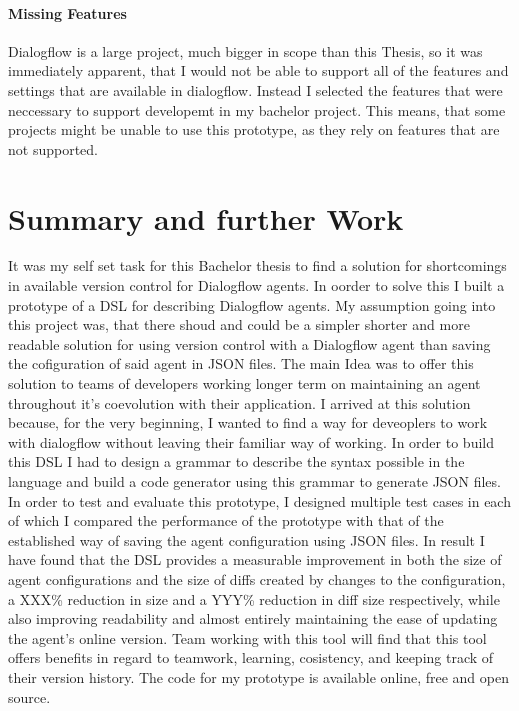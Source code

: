 \subsubsection{Missing  Features}

Dialogflow is a large project, much bigger in scope than this Thesis, so it was immediately apparent, that I would not be able to support all of the features and settings that are available in dialogflow.
Instead I selected the features that were neccessary to support developemt in my bachelor project.
This means, that some projects might be unable to use this prototype, as they rely on features that are not supported.


\chapter{Summary and further Work}

It was my self set task for this Bachelor thesis to find a solution for shortcomings in available version control for Dialogflow agents. In oorder to solve this I built a prototype of a DSL for describing Dialogflow agents.
My assumption going into this project was, that there shoud and could be a simpler shorter and more readable solution for using version control with a Dialogflow agent than saving the cofiguration of said agent in JSON files.
The main Idea was to offer this solution to teams of developers working longer term on maintaining an agent throughout it's coevolution with their application.
I arrived at this solution because, for the very beginning, I wanted to find a way for deveoplers to work with dialogflow without leaving their familiar way of working.
In order to build this DSL I had to design a grammar to describe the syntax possible in the language and build a code generator using this grammar to generate JSON files.
In order to test and evaluate this prototype, I designed multiple test cases in each of which I compared the performance of the prototype with that of the established way of saving the agent configuration using JSON files.
In result I have found that the DSL provides a measurable improvement in both the size of agent configurations and the size of diffs created by changes to the configuration, a XXX\% reduction in size and a YYY\% reduction in diff size respectively, while also improving readability and almost entirely maintaining the ease of updating the agent's online version.
Team working with this tool will find that this tool offers benefits in regard to teamwork, learning, cosistency, and keeping track of their version history.
The code for my prototype is available online, free and open source.

